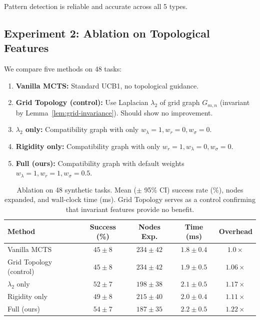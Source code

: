 \documentclass[11pt]{article}
\begin{document}
Pattern detection is reliable and accurate across all 5 types.

\subsection{Experiment 2: Ablation on Topological Features}

\label{sec:ablation}

We compare five methods on 48 tasks:

\begin{enumerate}
\item \textbf{Vanilla MCTS:} Standard UCB1, no topological guidance.

\item \textbf{Grid Topology (control):} Use Laplacian $\lambda_2$ of grid graph $G_{m,n}$ (invariant by Lemma~\ref{lem:grid-invariance}). Should show no improvement.

\item \textbf{$\lambda_2$ only:} Compatibility graph with only $w_\lambda = 1, w_r = 0, w_\sigma = 0$.

\item \textbf{Rigidity only:} Compatibility graph with only $w_r = 1, w_\lambda = 0, w_\sigma = 0$.

\item \textbf{Full (ours):} Compatibility graph with default weights $w_\lambda = 1, w_r = 1, w_\sigma = 0.5$.
\end{enumerate}

\begin{table}[h]
\centering
\caption{Ablation on 48 synthetic tasks. Mean ($\pm$ 95\% CI) success rate (\%), nodes expanded, and wall-clock time (ms). Grid Topology serves as a control confirming that invariant features provide no benefit.}
\label{tab:ablation}
\begin{tabular}{lcccc}
\toprule
\textbf{Method} & \textbf{Success (\%)} & \textbf{Nodes Exp.} & \textbf{Time (ms)} & \textbf{Overhead} \\
\midrule
Vanilla MCTS & $45 \pm 8$ & $234 \pm 42$ & $1.8 \pm 0.4$ & $1.0\times$ \\
Grid Topology (control) & $45 \pm 8$ & $234 \pm 42$ & $1.9 \pm 0.5$ & $1.06\times$ \\
$\lambda_2$ only & $52 \pm 7$ & $198 \pm 38$ & $2.1 \pm 0.5$ & $1.17\times$ \\
Rigidity only & $49 \pm 8$ & $215 \pm 40$ & $2.0 \pm 0.4$ & $1.11\times$ \\
Full (ours) & $54 \pm 7$ & $187 \pm 35$ & $2.2 \pm 0.5$ & $1.22\times$ \\
\bottomrule
\end{tabular}
\end{table}
\end{document}
